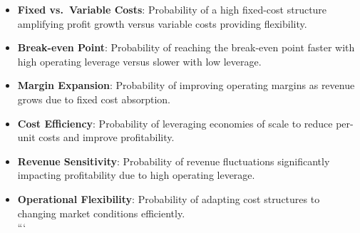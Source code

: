 \documentclass[
]{book}
\providecommand{\tightlist}{%
  \setlength{\itemsep}{0pt}\setlength{\parskip}{0pt}}
\begin{document}
\begin{itemize}
\tightlist
\item
  \textbf{Fixed vs.~Variable Costs}: Probability of a high fixed-cost structure amplifying profit growth versus variable costs providing flexibility.\\
\item
  \textbf{Break-even Point}: Probability of reaching the break-even point faster with high operating leverage versus slower with low leverage.\\
\item
  \textbf{Margin Expansion}: Probability of improving operating margins as revenue grows due to fixed cost absorption.\\
\item
  \textbf{Cost Efficiency}: Probability of leveraging economies of scale to reduce per-unit costs and improve profitability.\\
\item
  \textbf{Revenue Sensitivity}: Probability of revenue fluctuations significantly impacting profitability due to high operating leverage.\\
\item
  \textbf{Operational Flexibility}: Probability of adapting cost structures to changing market conditions efficiently.\\
  ```
\end{itemize}

  
\end{document}
